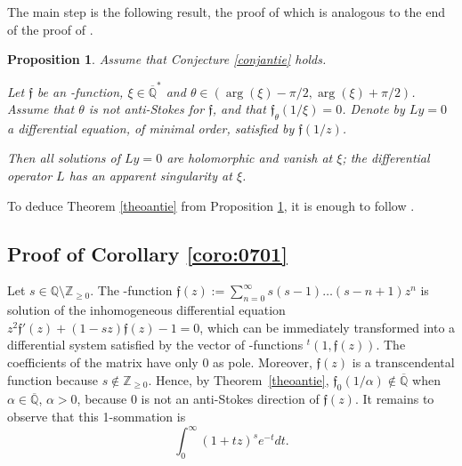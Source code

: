 \documentclass[reqno,12pt]{article}
\numberwithin{equation}{section}
\newtheorem{prop}{Proposition}
\theoremstyle{remark}
\newcommand{\Q}{\mathbb{Q}}
\newcommand{\Qbar}{\overline{\mathbb Q}}
\newcommand{\etoile}{^*}
\newcommand{\tantie}{\foreignlanguage{russian}{\CYREREV}}
\newcommand{\antie}{\text{\tantie}}
\newcommand{\fgo}{\mathfrak{f}}
\begin{document}
The main step is the following result, the proof of which is analogous to the end of the proof of \cite[Corollary 2.2]{beukers}.

\begin{prop}\label{propintermed} 
Assume that Conjecture \ref{conjantie}  holds.

Let   $\fgo$ be an \antie-function,  $\xi\in\Qbar\etoile$ and $\theta\in (\arg(\xi)-\pi/2,\arg(\xi)+\pi/2)$. Assume that   $\theta$ is not anti-Stokes for   $\fgo$, and that $\fgo_\theta(1/\xi)=0$. Denote by $Ly=0$ a differential equation, of minimal order, satisfied by $\fgo(1/z)$. 

Then all solutions of $Ly=0$ are holomorphic and vanish at $\xi$; the differential operator $L$ has an apparent singularity at $\xi$.
\end{prop}

To deduce  Theorem \ref{theoantie} from Proposition \ref{propintermed}, it is enough to follow \cite[\S 3]{beukers}.



\subsection{Proof of Corollary \ref{coro:0701}}\label{ssec:proofcoro1}

Let $s\in \Q\setminus \mathbb Z_{\ge 0}$.
The \tantie-function $\fgo(z):=\sum_{n=0}^\infty  s(s-1)\ldots (s-n+1) z^n$ is solution of the inhomogeneous differential equation $z^2\fgo'(z)+(1-sz)\fgo(z)-1=0$, which can be immediately transformed into a differential system satisfied by the vector of \tantie-functions ${}^t(1, \fgo(z))$.  The coefficients of the matrix have only 0 as pole. Moreover, $\fgo(z)$ is a transcendental function because $s\notin \mathbb Z_{\ge 0}$. Hence, by Theorem~\ref{theoantie}, $\fgo_0(1/\alpha) \notin\Qbar$ when  
$\alpha\in \Qbar$, $\alpha>0$, because $0$ is not an anti-Stokes direction of $\fgo(z)$. It remains to observe that this 1-sommation is 
$$
\int_0^\infty (1+tz)^s e^{-t}dt.
$$
\end{document}
